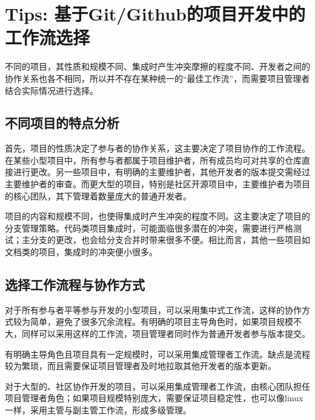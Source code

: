 \documentclass[../main.tex]{subfiles}
\begin{document}
\section{Tips: 基于Git/Github的项目开发中的工作流选择}

不同的项目，其性质和规模不同、集成时产生冲突摩擦的程度不同、开发者之间的协作关系也各不相同，所以并不存在某种统一的“最佳工作流”，而需要项目管理者结合实际情况进行选择。

\subsection{不同项目的特点分析}

首先，项目的性质决定了参与者的协作关系，这主要决定了项目协作的工作流程。在某些小型项目中，所有参与者都属于项目维护者，所有成员均可对共享的仓库直接进行更改。另一些项目中，有明确的主要维护者，其他开发者的版本提交需经过主要维护者的审查。而更大型的项目，特别是社区开源项目中，主要维护者为项目的核心团队，其下管理着数量庞大的普通开发者。

项目的内容和规模不同，也使得集成时产生冲突的程度不同。这主要决定了项目的分支管理策略。代码类项目集成时，可能面临很多潜在的冲突，需要进行严格测试；主分支的更改，也会给分支合并时带来很多不便。相比而言，其他一些项目如文档类的项目，集成时的冲突便小很多。

\subsection{选择工作流程与协作方式}

对于所有参与者平等参与开发的小型项目，可以采用集中式工作流，这样的协作方式较为简单，避免了很多冗余流程。有明确的项目主导角色时，如果项目规模不大，同样可以采用这样的工作流，项目管理者同时作为普通开发者参与版本提交。

有明确主导角色且项目具有一定规模时，可以采用集成管理者工作流。缺点是流程较为繁琐，而且需要保证项目管理者及时地拉取其他开发者的版本更新。

对于大型的、社区协作开发的项目，可以采用集成管理者工作流，由核心团队担任项目管理者角色；如果项目规模特别庞大，需要保证项目稳定性，也可以像linux一样，采用主管与副主管工作流，形成多级管理。
\end{document}
